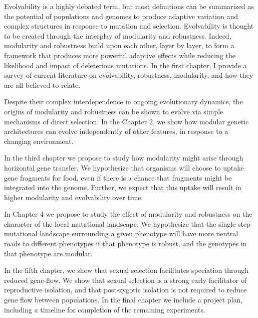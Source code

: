 Evolvability is a highly debated term, but most definitions can be summarized as the potential of populations and genomes to produce adaptive variation and complex structures in response to mutation and selection. Evolvability is thought to be created through the interplay of modularity and robustness. Indeed, modularity and robustness build upon each other, layer by layer, to form a framework that produces more powerful adaptive effects while reducing the likelihood and impact of deleterious mutations. In the first chapter, I provide a survey of current literature on evolvability, robustness, modularity, and how they are all believed to relate.

Despite their complex interdependence in ongoing evolutionary dynamics, the origins of modularity and robustness can be shown to evolve via simple mechanisms of direct selection. In the Chapter 2, we show how modular genetic architectures can evolve independently of other features, in response to a changing environment.

In the third chapter we propose to study how modularity might arise through horizontal gene transfer.  We hypothesize that organisms will choose to uptake gene fragments for food, even if there is a chance that fragments might be integrated into the genome.  Further, we expect that this uptake will result in higher modularity and evolvability over time.

In Chapter 4 we propose to study the effect of modularity and robustness on the character of the local mutational landscape.  We hypothesize that the single-step mutational landscape surrounding a given phenotype will have more neutral roads to different phenotypes if that phenotype is robust, and the genotypes in that phenotype are modular.

In the fifth chapter, we show that sexual selection facilitates speciation through reduced gene-flow.  We show that sexual selection is a strong early facilitator of reproductive isolation, and that post-zygotic isolation is not required to reduce gene flow between populations.
In the final chapter we include a project plan, including a timeline for completion of the remaining experiments.
